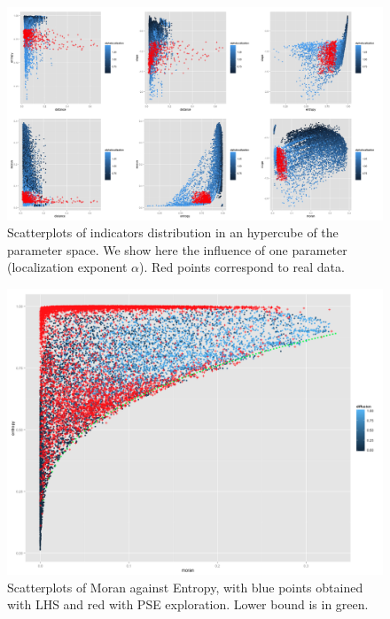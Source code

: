 \begin{figure}
\hspace{-2cm}
\includegraphics[width=1.4\textwidth]{Figures/PartII/Modeling/UrbanGrowth/all_alphaLoc}
\caption[LHS exploration of density model]{Scatterplots of indicators distribution in an hypercube of the parameter space. We show here the influence of one parameter (localization exponent $\alpha$). Red points correspond to real data.}
\label{fig:densityscatter}
\end{figure}



\begin{figure}
\includegraphics[width=\textwidth]{Figures/PartII/Modeling/UrbanGrowth/scaling_entropy_moran}
\caption[PSE exploration]{Scatterplots of Moran against Entropy, with blue points obtained with LHS and red with PSE exploration. Lower bound is in green.}
\label{fig:densitypse}
\end{figure}



